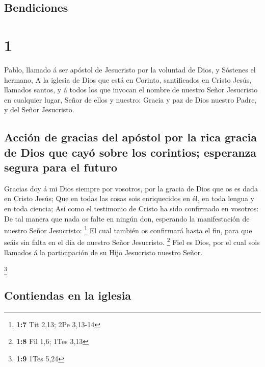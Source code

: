 \hypertarget{bendiciones}{%
\subsection{Bendiciones}\label{bendiciones}}

\hypertarget{section}{%
\section{1}\label{section}}

 Pablo, llamado á ser apóstol de Jesucristo por la voluntad
de Dios, y Sóstenes el hermano,  A la iglesia de Dios que
está en Corinto, santificados en Cristo Jesús, llamados santos, y á
todos los que invocan el nombre de nuestro Señor Jesucristo en cualquier
lugar, Señor de ellos y nuestro:  Gracia y paz de Dios
nuestro Padre, y del Señor Jesucristo.

\hypertarget{acciuxf3n-de-gracias-del-apuxf3stol-por-la-rica-gracia-de-dios-que-cayuxf3-sobre-los-corintios-esperanza-segura-para-el-futuro}{%
\subsection{Acción de gracias del apóstol por la rica gracia de Dios que
cayó sobre los corintios; esperanza segura para el
futuro}\label{acciuxf3n-de-gracias-del-apuxf3stol-por-la-rica-gracia-de-dios-que-cayuxf3-sobre-los-corintios-esperanza-segura-para-el-futuro}}

 Gracias doy á mi Dios siempre por vosotros, por la gracia
de Dios que os es dada en Cristo Jesús;  Que en todas las
cosas sois enriquecidos en él, en toda lengua y en toda ciencia;
 Así como el testimonio de Cristo ha sido confirmado en
vosotros:  De tal manera que nada os falte en ningún don,
esperando la manifestación de nuestro Señor Jesucristo: \footnote{\textbf{1:7}
  Tit 2,13; 2Pe 3,13-14}  El cual también os confirmará
hasta el fin, para que seáis sin falta en el día de nuestro Señor
Jesucristo. \footnote{\textbf{1:8} Fil 1,6; 1Tes 3,13}  Fiel
es Dios, por el cual sois llamados á la participación de su Hijo
Jesucristo nuestro Señor.

\footnote{\textbf{1:9} 1Tes 5,24}

\hypertarget{contiendas-en-la-iglesia}{%
\subsection{Contiendas en la iglesia}\label{contiendas-en-la-iglesia}}

